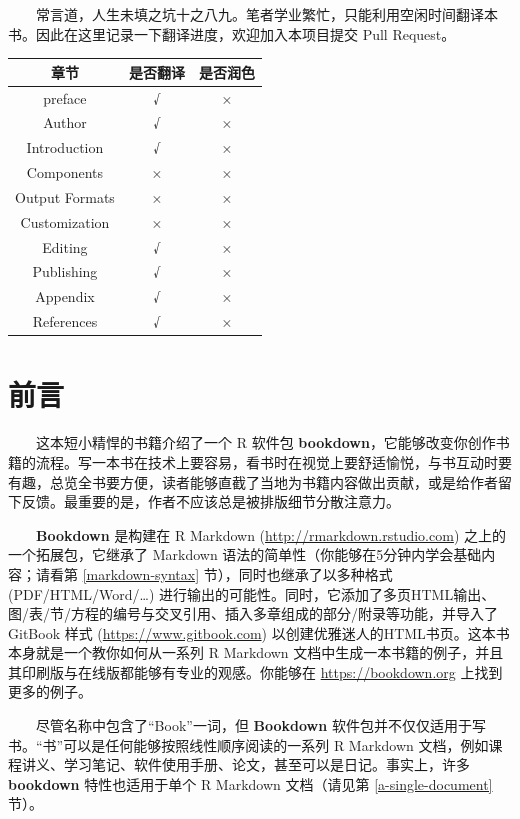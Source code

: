 \documentclass[
  12pt,
]{krantz}
\theoremstyle{definition}
\theoremstyle{definition}
\theoremstyle{definition}
\theoremstyle{definition}
\theoremstyle{remark}
\begin{document}
  常言道，人生未填之坑十之八九。笔者学业繁忙，只能利用空闲时间翻译本书。因此在这里记录一下翻译进度，欢迎加入本项目提交 Pull Request。

\begin{longtable}[]{@{}ccc@{}}
\toprule
章节 & 是否翻译 & 是否润色 \\
\midrule
\endhead
preface & √ & × \\
Author & √ & × \\
Introduction & √ & × \\
Components & × & × \\
Output Formats & × & × \\
Customization & × & × \\
Editing & √ & × \\
Publishing & √ & × \\
Appendix & √ & × \\
References & √ & × \\
\bottomrule
\end{longtable}

\hypertarget{ux524dux8a00}{%
\chapter*{前言}\label{ux524dux8a00}}


  这本短小精悍的书籍介绍了一个 R 软件包 \textbf{bookdown}，它能够改变你创作书籍的流程。写一本书在技术上要容易，看书时在视觉上要舒适愉悦，与书互动时要有趣，总览全书要方便，读者能够直截了当地为书籍内容做出贡献，或是给作者留下反馈。最重要的是，作者不应该总是被排版细节分散注意力。

  \textbf{Bookdown} 是构建在 R Markdown (\url{http://rmarkdown.rstudio.com}) 之上的一个拓展包，它继承了 Markdown 语法的简单性（你能够在5分钟内学会基础内容；请看第 \ref{markdown-syntax} 节），同时也继承了以多种格式 (PDF/HTML/Word/\ldots) 进行输出的可能性。同时，它添加了多页HTML输出、图/表/节/方程的编号与交叉引用、插入多章组成的部分/附录等功能，并导入了 GitBook 样式 (\url{https://www.gitbook.com}) 以创建优雅迷人的HTML书页。这本书本身就是一个教你如何从一系列 R Markdown 文档中生成一本书籍的例子，并且其印刷版与在线版都能够有专业的观感。你能够在 \url{https://bookdown.org} 上找到更多的例子。

  尽管名称中包含了``Book''一词，但 \textbf{Bookdown} 软件包并不仅仅适用于写书。``书''可以是任何能够按照线性顺序阅读的一系列 R Markdown 文档，例如课程讲义、学习笔记、软件使用手册、论文，甚至可以是日记。事实上，许多 \textbf{bookdown} 特性也适用于单个 R Markdown 文档（请见第 \ref{a-single-document} 节）。
\end{document}

